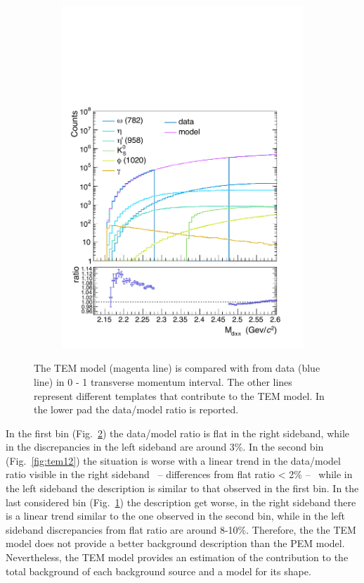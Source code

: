 \begin{figure} [htb]
\begin{subfigure}{.33\textwidth}
  \includegraphics[width=\linewidth]{gfx/can2}
  \caption{}
  \label{fig:tem23}
\end{subfigure}
\caption{The TEM model (magenta line) is compared with \minv from data (blue line) in 0 - 1 \gevc transverse momentum interval. The other lines represent different templates that contribute to the TEM model. In the lower pad the data/model ratio is reported.}
\label{fig:tem01}
\end{figure}

In the first \pt bin (Fig.~\ref{fig:tem01}) the data/model ratio is flat in the right sideband, 
while in the discrepancies  in the left sideband are around 3\%.
In the second bin (Fig.~\ref{fig:tem12}) the situation is worse with a linear trend in the 
data/model ratio visible in the right sideband \ -- differences from flat
ratio < 2\% -- \ while in the left sideband the description is similar to that observed in the first bin. 
In the last considered bin (Fig.~\ref{fig:tem23}) the description get worse, in the right sideband
there is a linear trend similar to the one observed in the second bin, while in the left sideband 
discrepancies from flat ratio are around 8-10\%.
Therefore, the the TEM model does not provide a better background description than the PEM model.
Nevertheless, the TEM model provides an estimation of the contribution to the total background
of each background source and a model for its shape.

